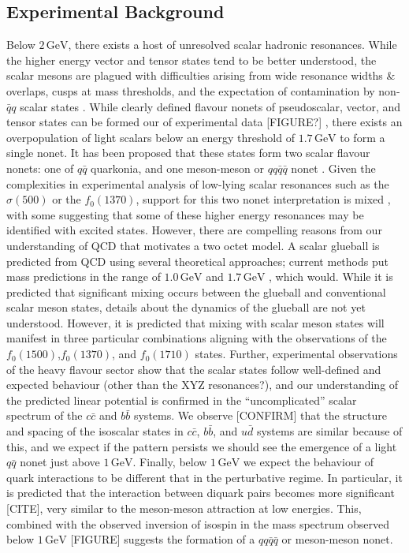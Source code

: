 \documentclass[aps,prd,onecolumn,showpacs,amsmath,amssymb,nofootinbib, 11pt]{revtex4} \pdfoutput=1
\newcommand{\gev}{\mathrm{GeV}}
\begin{document}
\subsection{Experimental Background}
Below $2\,\mathrm{GeV}$, there exists a host of unresolved scalar hadronic resonances. While the higher energy vector and tensor states tend to be better understood, the scalar mesons are plagued with difficulties arising from wide resonance widths \& overlaps, cusps at mass thresholds, and the expectation of contamination by non-$\bar{q}q$ scalar states \cite{PDG2014}. While clearly defined flavour nonets of pseudoscalar, vector, and tensor states can be formed our of experimental data [FIGURE?] \cite{Dobbs2017, others!!!}, there exists an overpopulation of light scalars below an energy threshold of $1.7\,\gev$ to form a single nonet. It has been proposed that these states form two scalar flavour nonets: one of $q\bar q$ quarkonia, and one meson-meson or $qq\bar{q}\bar{q}$ nonet \cite{Jaffe1977,Close2002,tHooft2008}. Given the complexities in experimental analysis of low-lying scalar resonances such as the $\sigma(500)$ or the $f_0(1370)$, support for this two nonet interpretation is mixed \cite{Ochs2001,Zhang2011}, with some suggesting that some of these higher energy resonances may be identified with excited states. However, there are compelling reasons from our understanding of QCD that motivates a two octet model. A scalar glueball is predicted from QCD using several theoretical approaches; current methods put mass predictions in the range of $1.0\,\gev$ and $1.7\,\gev$ \cite{Ochs2013, others???}, which would. While it is predicted that significant mixing occurs between the glueball and conventional scalar meson states, details about the dynamics of the glueball are not yet understood. However, it is predicted that mixing with scalar meson states will manifest in three particular combinations aligning with the observations of the $f_0(1500)$,$f_0(1370)$, and $f_0(1710)$ states. Further, experimental observations of the heavy flavour sector show that the scalar states follow well-defined and expected behaviour (other than the XYZ resonances?), and our understanding of the predicted linear potential is confirmed in the ``uncomplicated'' scalar spectrum of the $c\bar c$ and $b \bar b$ systems. We observe [CONFIRM] that the structure and spacing of the isoscalar states in $c\bar c$, $b \bar b$, and $u \bar d$ systems are similar because of this, and we expect if the pattern persists we should see the emergence of a light $q \bar q$ nonet just above $1\,\gev$. Finally, below $1\,\gev$ we expect the behaviour of quark interactions to be different that in the perturbative regime. In particular, it is predicted that the interaction between diquark pairs becomes more significant [CITE], very similar to the meson-meson attraction at low energies. This, combined with the observed inversion of isospin in the mass spectrum observed below $1\,\gev$ [FIGURE] suggests the formation of a $qq\bar{q}\bar{q}$ or meson-meson nonet. 
\end{document}
